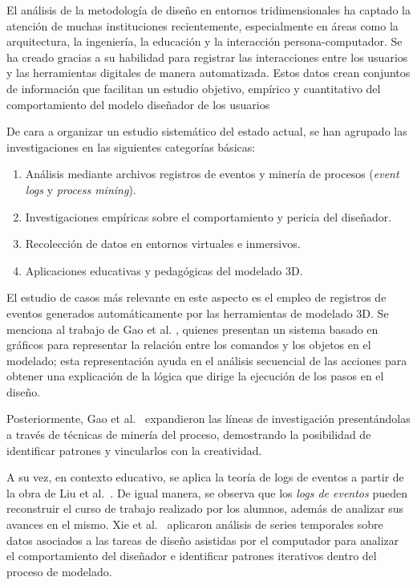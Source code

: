 
El análisis de la metodología de diseño en entornos tridimensionales ha captado la atención de muchas instituciones recientemente, especialmente en áreas como la arquitectura, la ingeniería, la educación y la interacción persona-computador. Se ha creado gracias a su habilidad para registrar las interacciones entre los usuarios y las herramientas digitales de manera automatizada. Estos datos crean conjuntos de información que facilitan un estudio objetivo, empírico y cuantitativo del comportamiento del modelo diseñador de los usuarios~\cite{jankowski2014,gao2021,gao2023}

De cara a organizar un estudio sistemático del estado actual, se han agrupado las investigaciones en las siguientes categorías básicas: 
\begin{enumerate}
 \item Análisis mediante archivos registros de eventos y minería de procesos (\textit{event logs} y \textit{process mining}).
 \item Investigaciones empíricas sobre el comportamiento y pericia del diseñador.
 \item Recolección de datos en entornos virtuales e inmersivos.
 \item Aplicaciones educativas y pedagógicas del modelado 3D.
\end{enumerate}

El estudio de casos más relevante en este aspecto es el empleo de registros de eventos generados automáticamente por las herramientas de modelado 3D. Se menciona al trabajo de Gao et al. \cite{gao2021}, quienes presentan un sistema basado en gráficos para representar la relación entre los comandos y los objetos en el modelado; esta representación ayuda en el análisis secuencial de las acciones para obtener una explicación de la lógica que dirige la ejecución de los pasos en el diseño.

Posteriormente, Gao et al.~\cite{gao2023} expandieron las líneas de investigación presentándolas a través de técnicas de minería del proceso, demostrando la posibilidad de identificar patrones y vincularlos con la creatividad.

A su vez, en contexto educativo, se aplica la teoría de logs de eventos a partir de la obra de Liu et al.~\cite{liu2022}. De igual manera, se observa que los \textit{logs de eventos} pueden reconstruir el curso de trabajo realizado por los alumnos, además de analizar sus avances en el mismo. Xie et al.~\cite{xie2014} aplicaron análisis de series temporales sobre datos asociados a las tareas de diseño asistidas por el computador para analizar el comportamiento del diseñador e identificar patrones iterativos dentro del proceso de modelado.

